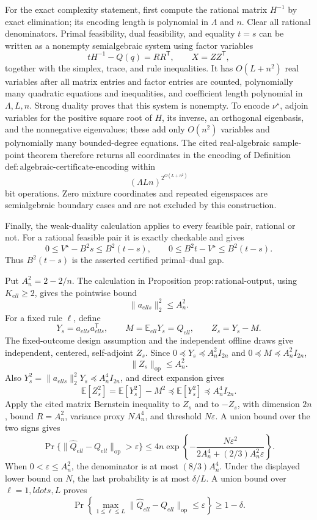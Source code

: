 For the exact complexity statement, first compute the rational matrix \(H^{-1}\) by exact elimination; its encoding length is polynomial in \(\Lambda\) and \(n\).  Clear all rational denominators.  Primal feasibility, dual feasibility, and equality \(t=s\) can be written as a nonempty semialgebraic system using factor variables
\[
 tH^{-1}-Q(q)=RR^{\mathsf T},
 \qquad
 X=ZZ^{\mathsf T},
\]
together with the simplex, trace, and rule inequalities.  It has \(O(L+n^2)\) real variables after all matrix entries and factor entries are counted, polynomially many quadratic equations and inequalities, and coefficient length polynomial in \(\Lambda,L,n\).  Strong duality proves that this system is nonempty.  To encode \(\nu^{\star}\), adjoin variables for the positive square root of \(H\), its inverse, an orthogonal eigenbasis, and the nonnegative eigenvalues; these add only \(O(n^2)\) variables and polynomially many bounded-degree equations.  The cited real-algebraic sample-point theorem therefore returns all coordinates in the encoding of Definition \(\mathrm{def:algebraic\mbox{-}certificate\mbox{-}encoding}\) within
\[
 (\Lambda Ln)^{2^{O(L+n^2)}}
\]
bit operations.  Zero mixture coordinates and repeated eigenspaces are semialgebraic boundary cases and are not excluded by this construction.

Finally, the weak-duality calculation applies to every feasible pair, rational or not.  For a rational feasible pair it is exactly checkable and gives
\[
 0\le V^{\star}-B^2s\le B^2(t-s),
 \qquad
 0\le B^2t-V^{\star}\le B^2(t-s).
\]
Thus \(B^2(t-s)\) is the asserted certified primal--dual gap.

Put \(A_n^2=2-2/n\).  The calculation in Proposition \(\mathrm{prop:rational\mbox{-}output}\), using \(K_{ell}\ge2\), gives the pointwise bound
\[
 \|a_{ell s}\|_2^2\le A_n^2.
\]
For a fixed rule \(\ell\), define
\[
 Y_s=a_{ell s}a_{ell s}^{\mathsf T},
 \qquad M=\mathbb E_{ell}Y_s=Q_{ell},
 \qquad Z_s=Y_s-M.
\]
The fixed-outcome design assumption and the independent offline draws give independent, centered, self-adjoint \(Z_s\).  Since \(0\preceq Y_s\preceq A_n^2I_{2n}\) and \(0\preceq M\preceq A_n^2I_{2n}\),
\[
 \|Z_s\|_{\mathrm{op}}\le A_n^2.
\]
Also \(Y_s^2=\|a_{ell s}\|_2^2Y_s\preceq A_n^4I_{2n}\), and direct expansion gives
\[
 \mathbb E[Z_s^2]=\mathbb E[Y_s^2]-M^2\preceq\mathbb E[Y_s^2]\preceq A_n^4I_{2n}.
\]
Apply the cited matrix Bernstein inequality to \(Z_s\) and to \(-Z_s\), with dimension \(2n\), bound \(R=A_n^2\), variance proxy \(NA_n^4\), and threshold \(N\varepsilon\).  A union bound over the two signs gives
\[
 \Pr\{\|\widehat Q_{ell}-Q_{ell}\|_{\mathrm{op}}>\varepsilon\}
 \le4n\exp\!\left\{-\frac{N\varepsilon^2}{2A_n^4+(2/3)A_n^2\varepsilon}\right\}.
\]
When \(0<\varepsilon\le A_n^2\), the denominator is at most \((8/3)A_n^4\).  Under the displayed lower bound on \(N\), the last probability is at most \(\delta/L\).  A union bound over \(\ell=1,ldots,L\) proves
\[
 \Pr\!\left\{\max_{1\le\ell\le L}\|\widehat Q_{ell}-Q_{ell}\|_{\mathrm{op}}\le\varepsilon\right\}\ge1-\delta.
\]

